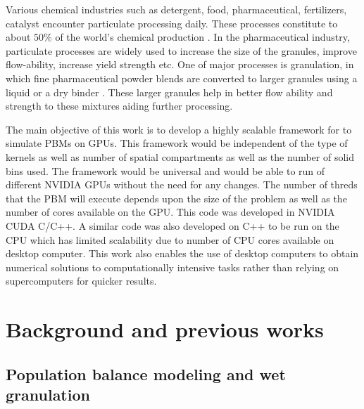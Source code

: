\documentclass[preprint,10pt,authoryear,review]{elsarticle}
\begin{document}
Various chemical industries such as detergent, food, pharmaceutical, fertilizers, catalyst 
encounter particulate processing daily. These processes constitute to about $50\%$ of the 
world's chemical production \citep{seville1997}.
In the pharmaceutical industry, particulate processes are widely used to increase 
the size of the granules, improve flow-ability, increase yield strength etc. One of 
major processes is granulation, in which fine pharmaceutical powder 
blends are converted to larger granules using a liquid or a dry binder \citep{Chaturbedi2017}. 
These larger granules help in better flow ability and strength to these mixtures 
aiding further processing. 
%


The main objective of this work is to develop a highly scalable framework for to simulate 
PBMs on GPUs. This framework would be independent of the type of kernels as well as number 
of spatial compartments as well as the number of solid bins used. The framework would be 
universal and would be able to run of different NVIDIA GPUs without the need for any changes. 
The number of threds that the PBM will execute depends upon the size of the problem as well as 
the number of cores available on the GPU. This code was developed in NVIDIA CUDA C/C++. 
A similar code was also developed on C++ to be run on the CPU which has limited scalability 
due to number of CPU cores available on desktop computer. This work also enables the use of 
desktop computers to obtain numerical solutions to computationally intensive tasks rather 
than relying on supercomputers for quicker results.


\section{Background and previous works}
\label{secBkgd}
\subsection{Population balance modeling and wet granulation}
\end{document}
